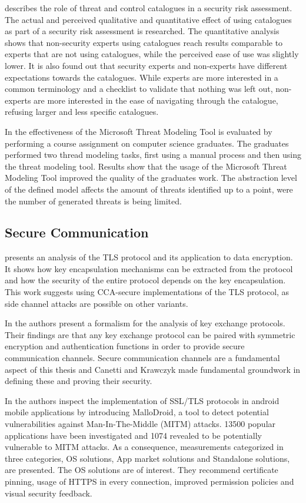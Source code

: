 \cite{cataloguerole} describes the role of threat and control catalogues in a security risk assessment. The actual and perceived qualitative and quantitative effect of using catalogues as part of a security risk assessment is researched. The quantitative analysis shows that non-security experts using catalogues reach results comparable to experts that are not using catalogues, while the perceived ease of use was slightly lower. It is also found out that security experts and non-experts have different expectations towards the catalogues. While experts are more interested in a common terminology and a checklist to validate that nothing was left out, non-experts are more interested in the ease of navigating through the catalogue, refusing larger and less specific catalogues.

In \cite{strideeval} the effectiveness of the Microsoft Threat Modeling Tool is evaluated by performing a course assignment on computer science graduates. The graduates performed two thread modeling tasks, first using a manual process and then using the threat modeling tool. Results show that the usage of the Microsoft Threat Modeling Tool improved the quality of the graduates work. The abstraction level of the defined model affects the amount of threats identified up to a point, were the number of generated threats is being limited.


\subsection{Secure Communication}
\label{subsection:securecommunication}


\cite{tlssysanalysis} presents an analysis of the TLS protocol and its application to data encryption. It shows how key encapsulation mechanisms can be extracted from the protocol and how the security of the entire protocol depends on the key encapsulation. This work suggests using CCA-secure implementations of the TLS protocol, as side channel attacks are possible on other variants.

In \cite{canetti2001analysis} the authors present a formalism for the analysis of key exchange protocols. Their findings are that any key exchange protocol can be paired with symmetric encryption and authentication functions in order to provide secure communication channels. Secure communication channels are a fundamental aspect of this thesis and Canetti and Krawczyk made fundamental groundwork in defining these and proving their security.

In \cite{sslandroid} the authors inspect the implementation of SSL/TLS protocols in android mobile applications by introducing MalloDroid, a tool to detect potential vulnerabilities against Man-In-The-Middle (MITM) attacks. 13500 popular applications have been investigated and 1074 revealed to be potentially vulnerable to MITM attacks. As a consequence, measurements categorized in three categories, OS solutions, App market solutions and Standalone solutions, are presented. The OS solutions are of interest. They recommend certificate pinning, usage of HTTPS in every connection, improved permission policies and visual security feedback.

